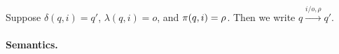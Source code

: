 Suppose $\delta(q,i) = q'$, $\lambda(q,i)= o$, and $\pi(q,i) = \rho$.
Then we write $q \xrightarrow{i/o,\rho} q'$.

\paragraph{Semantics.}
%

